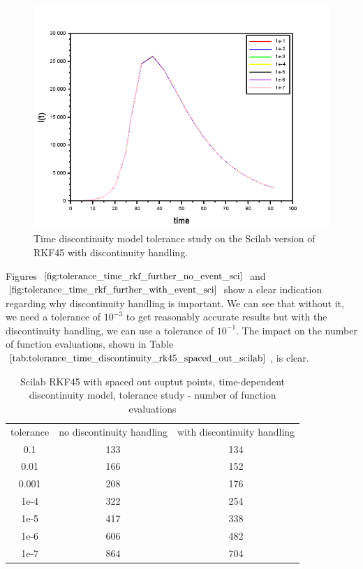 \begin{figure}[H]
\centering
\includegraphics[width=0.7\linewidth]{./figures/tolerance_time_rkf_further_with_event_sci}
\caption{Time discontinuity model tolerance study on the Scilab version of RKF45 with discontinuity handling.}
\label{fig:tolerance_time_rkf_further_with_event_sci}
\end{figure}

Figures $\ref{fig:tolerance_time_rkf_further_no_event_sci}$ and $\ref{fig:tolerance_time_rkf_further_with_event_sci}$ show a clear indication regarding why discontinuity handling is important. We can see that without it, we need a tolerance of $10^{-3}$ to get reasonably accurate results but with the discontinuity handling, we can use a tolerance of $10^{-1}$. The impact on the number of function evaluations, shown in Table $\ref{tab:tolerance_time_discontinuity_rk45_spaced_out_scilab}$, is clear.

\begin{table}[H]
\caption {Scilab RKF45 with spaced out ouptut points, time-dependent discontinuity model, tolerance study - number of function evaluations} 
\label{tab:tolerance_time_discontinuity_rk45_spaced_out_scilab} 
\begin{center}
\begin{tabular}{ c c c }
tolerance & no discontinuity handling & with discontinuity handling\\ 
0.1 & 133 & 134 \\
0.01 & 166 & 152 \\
0.001 & 208 & 176 \\
1e-4 & 322 & 254 \\
1e-5 & 417 & 338 \\
1e-6 & 606 & 482 \\
1e-7 & 864 & 704 \\
\end{tabular}
\end{center}
\end{table}

